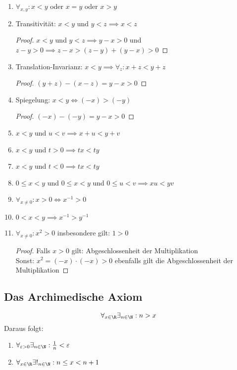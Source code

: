 \begin{enumerate}[resume]
	\item $\forall_{x,y}: x<y $ oder $x=y$ oder $x>y$
	\item Transitivität: $x<y$ und $y<z \implies x<z$
		\begin{proof}
		$x<y$ und $y<z \implies y-x>0$ und $z-y > 0 \implies z-x > (z-y) + (y-x) >0$   
		\end{proof}
	\item Translation-Invarianz: $x<y \implies \forall_{z}: x+z < y+z$
		\begin{proof}
			$(y+z)-(x-z) = y-x >0$ 
		\end{proof}
	\item Spiegelung: $x<y \iff (-x) > (-y)$
		\begin{proof}
			$(-x)-(-y) = y-x > 0$ 
		\end{proof}
	\item $x<y$ und $u < v \implies x+u < y+v$
	
	\item $x<y$ und $t>0 \implies tx <ty$
	\item $x<y$ und $t<0 \implies tx<ty$
	\item $0 \le x < y$ und $0  \le x < y$ und $0 \le  u < v \implies xu < yv$
	\item $\forall_{x\neq 0}: x>0 \iff x^{-1} >0 $ 
	\item $0<x<y \implies x^{-1}> y^{-1}$
	\item $\forall_{x \neq 0}: x^{2}>0$ insbesondere gilt: $1>0$
		\begin{proof}
		Falls $x>0$ gilt: Abgeschlossenheit der Multiplikation\\
		Sonst: $x^{2}= (-x) \cdot (-x) > 0 $ ebenfalls gilt die Abgeschlossenheit der Multiplikation
		\end{proof}
\end{enumerate}

\subsection{Das Archimedische Axiom}
\[
\forall_{x \in \R}\exists_{n \in \N}: n>x  
\]
Daraus folgt:

\begin{enumerate}[resume]
	\item $\forall_{\varepsilon >0}\exists_{n \in  \N}: \frac{1}{n} < \varepsilon$
	\item $\forall_{x \in  \R} \exists!_{n \in  \N}: n \le x < n+1 $ 
\end{enumerate}

